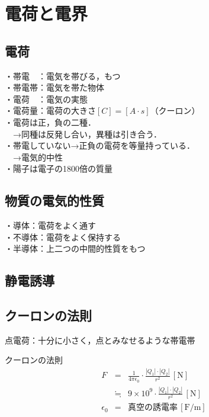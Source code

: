 \section{電荷と電界}
\subsection{電荷}
・帯電　：電気を帯びる，もつ\\
・帯電帯：電気を帯た物体\\
・電荷　：電気の実態\\
・電荷量：電荷の大きさ$[C]=[A \cdot s]$（クーロン）\\
・電荷は正，負の二種．\\
　→同種は反発し合い，異種は引き合う．\\
・帯電していない→正負の電荷を等量持っている．\\
　→電気的中性\\
・陽子は電子の1800倍の質量\\

\subsection{物質の電気的性質}
・導体：電荷をよく通す\\
・不導体：電荷をよく保持する\\
・半導体：上二つの中間的性質をもつ\\

\subsection{静電誘導}
\subsection{クーロンの法則}
点電荷：十分に小さく，点とみなせるような帯電帯\\

\begin{itembox}[l]{クーロンの法則}
  \begin{eqnarray}
    F &=&\frac {1}{4\pi \epsilon _{0}}\cdot \frac {\left| Q_{1}\right| \cdot \left| Q_{2}\right| }{r^{2}}\, [\textrm{N}] \\
    &\fallingdotseq& 9\times 10^{9} \cdot \frac {\left| Q_{1}\right| \cdot \left| Q_{2}\right| }{r^{2}}\, [\textrm{N}]\\
    \epsilon_0 &=& \mbox{真空の誘電率}\, [\textrm{F/m}]
  \end{eqnarray}
\end{itembox}

